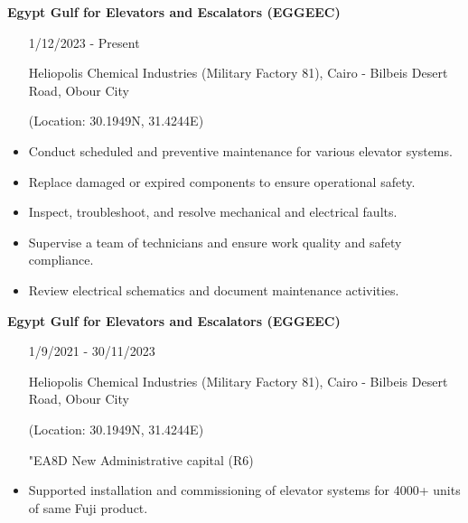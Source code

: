 \documentclass[9pt]{extarticle}
\begin{document}
\begin{paracol}{2}
\begin{expbox}[title = {\bfseries Maintenance Engineer}]
	 {\bfseries Egypt Gulf for Elevators and Escalators (EGGEEC)} 
	 \begin{itemize}[nosep,align = left, leftmargin = !, labelwidth = ] 
		 \item[\faCalendar*] 1/12/2023 - Present
		 \item[{\faMapMarker*}] Heliopolis Chemical Industries (Military Factory 81), Cairo - Bilbeis Desert Road, Obour City \par(Location: 30.1949N, 31.4244E)
	 \end{itemize}
{	\color{light}\dotfill}\smallskip 
	 \begin{itemize}[nosep,align = left, leftmargin = !, labelwidth = ]\raggedright
\item Conduct scheduled and preventive maintenance for various elevator systems.
                            \item Replace damaged or expired components to ensure operational safety.
                            \item Inspect, troubleshoot, and resolve mechanical and electrical faults.
                            \item Supervise a team of technicians and ensure work quality and safety compliance.
                            \item Review electrical schematics and document maintenance activities.	 \end{itemize}
\end{expbox}
\begin{expbox}[title = {\bfseries Testing \& Commissioning Engineer}]
	 {\bfseries Egypt Gulf for Elevators and Escalators (EGGEEC)} 
	 \begin{itemize}[nosep,align = left, leftmargin = !, labelwidth = ] 
		 \item[\faCalendar*] 1/9/2021 - 30/11/2023
		 \item[{\faMapMarker*}] Heliopolis Chemical Industries (Military Factory 81), Cairo - Bilbeis Desert Road, Obour City \par(Location: 30.1949N, 31.4244E)
		 \item[{\seg\char"EA8D}] New Administrative capital (R6)
	 \end{itemize}
{	\color{light}\dotfill}\smallskip 
	 \begin{itemize}[nosep,align = left, leftmargin = !, labelwidth = ]\raggedright
   \item Supported installation and commissioning of elevator systems for 4000+ units of same Fuji product.

\end{itemize}
\end{expbox}
\end{paracol}
\end{document}
